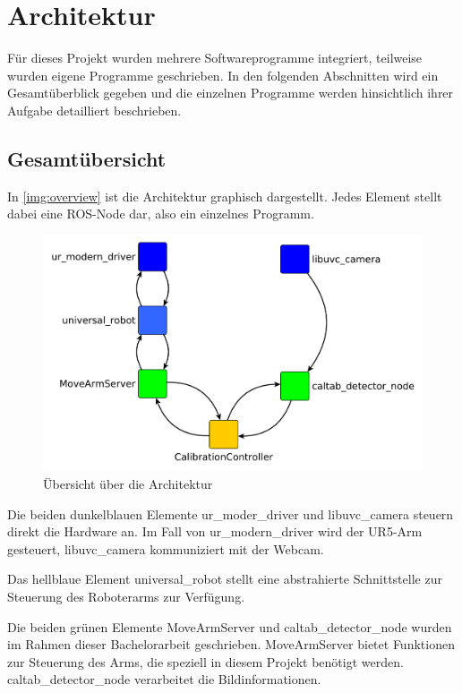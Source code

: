 \chapter{Architektur}
Für dieses Projekt wurden mehrere Softwareprogramme integriert, teilweise wurden eigene Programme geschrieben. In den folgenden Abschnitten wird ein Gesamtüberblick gegeben und die einzelnen Programme werden hinsichtlich ihrer Aufgabe detailliert beschrieben.

\section{Gesamtübersicht} %
\label{sec:gesamtübersicht}
In \autoref{img:overview} ist die Architektur graphisch dargestellt. Jedes Element stellt dabei eine ROS-Node dar, also ein einzelnes Programm.

\begin{figure}[!hbt]
	\centering
	\vspace{1ex}
	\includegraphics[scale=0.6]{../images/overview}
	\caption[Übersicht über die Architektur]{\label{img:overview} Übersicht über die Architektur}
	\vspace{1ex}
\end{figure}

Die beiden dunkelblauen Elemente ur\_moder\_driver und libuvc\_camera steuern direkt die Hardware an. Im Fall von ur\_modern\_driver wird der UR5-Arm gesteuert, libuvc\_camera kommuniziert mit der Webcam.

Das hellblaue Element universal\_robot stellt eine abstrahierte Schnittstelle zur Steuerung des Roboterarms zur Verfügung.

Die beiden grünen Elemente MoveArmServer und caltab\_detector\_node wurden im Rahmen dieser Bachelorarbeit geschrieben. MoveArmServer bietet Funktionen zur Steuerung des Arms, die speziell in diesem Projekt benötigt werden. caltab\_detector\_node verarbeitet die Bildinformationen.

